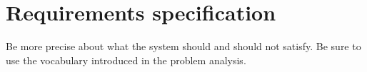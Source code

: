 \chapter{Requirements specification}

Be more precise about what the system should and should not satisfy.
Be sure to use the vocabulary introduced in the problem analysis.








